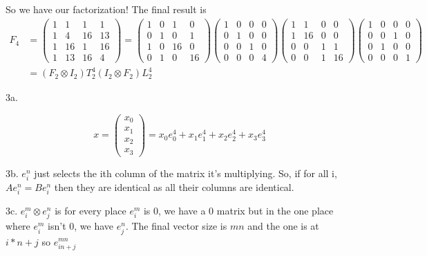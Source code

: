 \documentclass{article}
\begin{document}
	So we have our factorization! The final result is
	\begin{align}
		F_4&=\begin{pmatrix}
			1 & 1 & 1 & 1 \\
			1 & 4 & 16 & 13 \\
			1 & 16 & 1 & 16 \\
			1 & 13 & 16 & 4
		\end{pmatrix}=
		\begin{pmatrix}
			1 & 0 & 1 & 0 \\
			0 & 1 & 0 & 1 \\
			1 & 0 & 16 & 0 \\
			0 & 1 & 0 & 16
		\end{pmatrix}
		\begin{pmatrix}
			1 & 0 & 0 & 0 \\
			0 & 1 & 0 & 0 \\
			0 & 0 & 1 & 0 \\
			0 & 0 & 0 & 4
		\end{pmatrix}
		\begin{pmatrix}
			1 & 1 & 0 & 0 \\
			1 & 16 & 0 & 0 \\
			0 & 0 & 1 & 1 \\
			0 & 0 & 1 & 16
		\end{pmatrix}
		\begin{pmatrix}
			1 & 0 & 0 & 0 \\
			0 & 0 & 1 & 0 \\
			0 & 1 & 0 & 0 \\
			0 & 0 & 0 & 1
		\end{pmatrix}\\
		&=(F_2 \otimes I_2)T_2^4(I_2 \otimes F_2)L_2^4
	\end{align}
	
	3a.
	
	\begin{equation}
		x=\begin{pmatrix}
			x_0 \\
			x_1 \\
			x_2 \\
			x_3
		\end{pmatrix}=x_0 e_0^4 + x_1e_1^4+x_2e_2^4+x_3e_3^4
	\end{equation}

	3b. $e_i^n$ just selects the ith column of the matrix it's multiplying. So, if for all i,
	$Ae_i^n=Be_i^n$ then they are identical as all their columns are identical.
	
	3c. $e_i^m \otimes e_j^n$ is for every place $e_i^m$ is 0, we have a 0 matrix but in the one place where $e_i^m$ isn't 0, we have $e_j^n$. The final vector size is $mn$ and the one is at $i*n+j$ so $e_{in+j}^{mn}$
	
\end{document}
